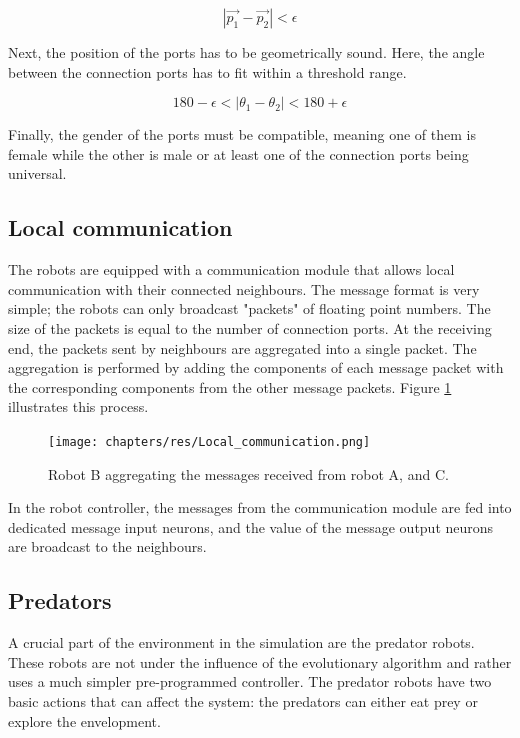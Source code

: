 \begin{equation}
|\vec{p_1} - \vec{p_2}| < \epsilon
\end{equation}

Next, the position of the ports has to be geometrically sound.
Here, the angle between the connection ports has to fit within a threshold range.

\begin{equation}
180 - \epsilon < |\theta_1 - \theta_2| < 180 + \epsilon
\end{equation}

Finally, the gender of the ports must be compatible, meaning one of them is female while the other is male or at least one of the connection ports being universal.
		
\subsection{Local communication}
\label{sec:local_comm}
The robots are equipped with a communication module that allows local communication with their connected neighbours.
The message format is very simple; the robots can only broadcast "packets" of floating point numbers.
The size of the packets is equal to the number of connection ports.
At the receiving end, the packets sent by neighbours are aggregated into a single packet.
The aggregation is performed by adding the components of each message packet with the corresponding components from the other message packets. Figure \ref{fig:local_communication} illustrates this process.

\begin{figure}[H]
	\centering
	\texttt{[image: chapters/res/Local\_communication.png]}
	\caption{Robot B aggregating the messages received from robot A, and C.}
	\label{fig:local_communication}
\end{figure}

In the robot controller, the messages from the communication module are fed into dedicated message input neurons, and the value of the message output neurons are broadcast to the neighbours.

		
\subsection{Predators}
A crucial part of the environment in the simulation are the predator robots.
These robots are not under the influence of the evolutionary algorithm and rather uses a much simpler pre-programmed controller.
The predator robots have two basic actions that can affect the system: the predators can either eat prey or explore the envelopment.

